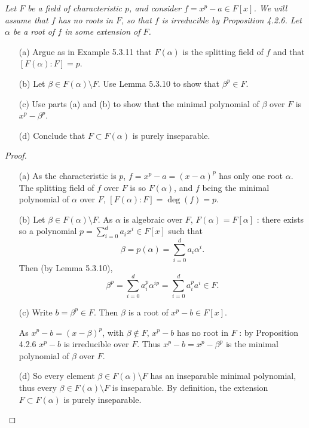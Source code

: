 \documentclass[11pt,a4paper]{article}
\begin{document}
{\it Let $F$ be a field of characteristic $p$, and consider $f = x^p -a \in F[x]$. We will assume that $f$ has no roots in $F$, so that $f$ is irreducible by Proposition 4.2.6. Let $\alpha$ be a root of $f$ in some extension of $F$.
\begin{enumerate}
\item[(a)] Argue as in Example 5.3.11 that $F(\alpha)$ is the splitting field of $f$ and that ${[F(\alpha):F]=p}$.
\item[(b)] Let $\beta \in F(\alpha) \setminus F$. Use Lemma 5.3.10 to show that $\beta^p \in F$.
\item[(c)] Use parts (a) and (b) to show that the minimal polynomial of $\beta$ over $F$ is $x^p - \beta^p$.
\item[(d)] Conclude that $F\subset F(\alpha)$ is purely inseparable.
\end{enumerate}
}

\begin{proof}
\begin{enumerate}
\item[(a)]
As the characteristic is $p$, $f =x^p -a = (x -\alpha)^p$ has only one root $\alpha$. The splitting field of $f$ over $F$ is so $F(\alpha)$, and $f$ being the minimal polynomial of  $\alpha$ over $F$, $[F(\alpha):F] = \deg(f) = p$.

\item[(b)]
Let $\beta \in F(\alpha) \setminus F$. As $\alpha$ is algebraic over $F$, $F(\alpha) = F[\alpha]$ : there exists so a polynomial $p = \sum_{i=0}^d a_i x^i \in F[x]$ such that
$$\beta = p(\alpha) = \sum_{i=0}^d a_i \alpha^i.$$
Then  (by Lemma 5.3.10), $$\beta^p =  \sum_{i=0}^d a_i^p \alpha^{ip} =  \sum_{i=0}^d a_i^p a^{i} \in F .$$

\item[(c)]
Write $b = \beta^p \in F$. Then $\beta$ is a root of $x^p -b \in F[x]$.

As $x^p-b = (x-\beta)^p$, with $\beta \not \in F$, $x^p -b$ has no root in $F$ : by Proposition 4.2.6 $x^p - b$ is irreducible over $F$. Thus $x^p -b = x^p -\beta^p$ is the minimal polynomial of $\beta$ over $F$.

\item[(d)] So every element $\beta \in F(\alpha) \setminus F$ has an inseparable minimal polynomial, thus every $\beta\in F(\alpha) \setminus F$ is inseparable. By definition, the extension $F\subset F(\alpha)$ is purely inseparable.
\end{enumerate}
\end{proof}
\end{document}
